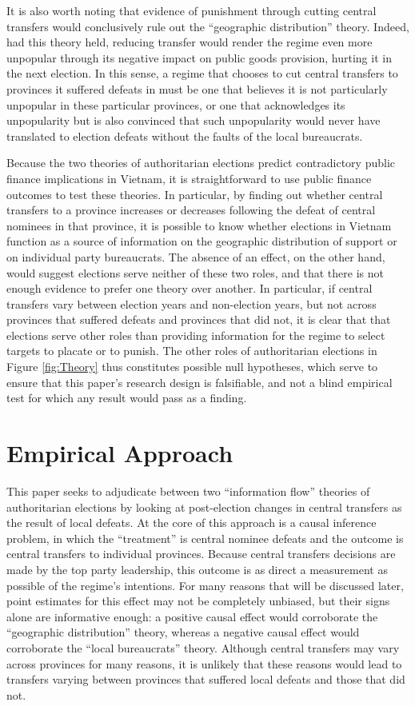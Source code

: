 \documentclass[12pt]{article}\usepackage[]{graphicx}\usepackage[]{color}
\newcommand{\1}{\mathbbm{1}}
\begin{document}
It is also worth noting that evidence of punishment through cutting central transfers would conclusively rule out the ``geographic distribution'' theory. Indeed, had this theory held, reducing transfer would render the regime even more unpopular through its negative impact on public goods provision, hurting it in the next election. In this sense, a regime that chooses to cut central transfers to provinces it suffered defeats in must be one that believes it is not particularly unpopular in these particular provinces, or one that acknowledges its unpopularity but is also convinced that such unpopularity would never have translated to election defeats without the faults of the local bureaucrats.

Because the two theories of authoritarian elections predict contradictory public finance implications in Vietnam, it is straightforward to use public finance outcomes to test these theories. In particular, by finding out whether central transfers to a province increases or decreases following the defeat of central nominees in that province, it is possible to know whether elections in Vietnam function as a source of information on the geographic distribution of support or on individual party bureaucrats. The absence of an effect, on the other hand, would suggest elections serve neither of these two roles, and that there is not enough evidence to prefer one theory over another. In particular, if central transfers vary between election years and non-election years, but not across provinces that suffered defeats and provinces that did not, it is clear that that elections serve other roles than providing information for the regime to select targets to placate or to punish. The other roles of authoritarian elections in Figure \ref{fig:Theory} thus constitutes possible null hypotheses, which serve to ensure that this paper's research design is falsifiable, and not a blind empirical test for which any result would pass as a finding.

\section{Empirical Approach}
\label{sec:methods}

This paper seeks to adjudicate between two ``information flow'' theories of authoritarian elections by looking at post-election changes in central transfers as the result of local defeats. At the core of this approach is a causal inference problem, in which the ``treatment'' is central nominee defeats and the outcome is central transfers to individual provinces. Because central transfers decisions are made by the top party leadership, this outcome is as direct a measurement as possible of the regime's intentions. For many reasons that will be discussed later, point estimates for this effect may not be completely unbiased, but their signs alone are informative enough: a positive causal effect would corroborate the ``geographic distribution'' theory, whereas a negative causal effect would corroborate the ``local bureaucrats'' theory. Although central transfers may vary across provinces for many reasons, it is unlikely that these reasons would lead to transfers varying between provinces that suffered local defeats and those that did not. 
\end{document}
